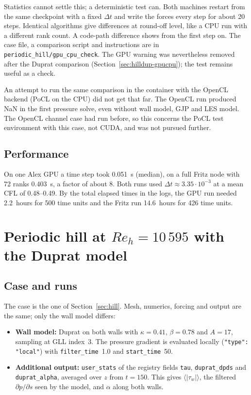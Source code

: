 \documentclass[11pt,a4paper]{article}
\newcommand{\code}[1]{\texttt{#1}}
\newcommand{\dpds}{\partial p/\partial s}
\begin{document}
Statistics cannot settle this; a deterministic test can. Both machines
restart from the same checkpoint with a fixed $\Delta t$ and write the forces
every step for about 20 steps. Identical algorithms give differences at
round-off level, like a CPU run with a different rank count. A code-path
difference shows from the first step on. The case file, a comparison script
and instructions are in \code{periodic\_hill/gpu\_cpu\_check}. The GPU
warning was nevertheless removed after the Duprat comparison
(Section~\ref{sec:hilldup-gpucpu}); the test remains useful as a check.

An attempt to run the same comparison in the container with the OpenCL
backend (PoCL on the CPU) did not get that far. The OpenCL run produced NaN
in the first pressure solve, even without wall model, GJP and LES model. The
OpenCL channel case had run before, so this concerns the PoCL test
environment with this case, not CUDA, and was not pursued further.

\subsection{Performance}

On one Alex GPU a time step took 0.051~s (median), on a full Fritz node with
72 ranks 0.403~s, a factor of about 8. Both runs used
$\Delta t \approx 3.35\cdot10^{-3}$ at a mean CFL of 0.48--0.49. By the total
elapsed times in the logs, the GPU run needed 2.2~hours for 500 time units and
the Fritz run 14.6~hours for 426 time units.

\section{Periodic hill at $Re_h = 10\,595$ with the Duprat model}
\label{sec:hilldup}

\subsection{Case and runs}

The case is the one of Section~\ref{sec:hill}. Mesh, numerics, forcing and
output are the same; only the wall model differs:
\begin{itemize}
  \item \textbf{Wall model:} Duprat on both walls with $\kappa = 0.41$,
    $\beta = 0.78$ and $A = 17$, sampling at GLL index~3. The pressure
    gradient is evaluated locally (\code{"type": "local"}) with
    \code{filter\_time}~1.0 and \code{start\_time}~50.
  \item \textbf{Additional output:} \code{user\_stats} of the registry fields
    \code{tau}, \code{duprat\_dpds} and \code{duprat\_alpha}, averaged over
    $z$ from $t = 150$. This gives $\langle|\tau_w|\rangle$, the filtered
    $\dpds$ seen by the model, and $\alpha$ along both walls.
\end{itemize}
\end{document}
